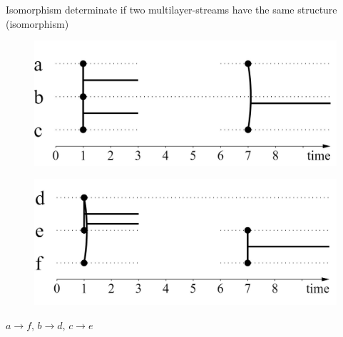 \documentclass[15pt]{beamer}
\begin{document}
\begin{frame}{Isomorphism}%
    determinate if two multilayer-streams have the same structure (isomorphism)
    
	\begin{minipage}{0.4\linewidth}
		\begin{figure}
			\centering
			\includegraphics[width=\linewidth]{img/iso1.jpg}
			\label{iso1}
		\end{figure}
	\end{minipage}
	\begin{minipage}{0.4\linewidth}
		\begin{figure}
			\centering
			\includegraphics[width=\linewidth]{img/iso2.jpg}
			\label{iso2}
		\end{figure}
	\end{minipage} \pause
	
	$a \rightarrow f $, $b \rightarrow d$, $c \rightarrow e$
    \pause
    

\end{frame}
\end{document}
